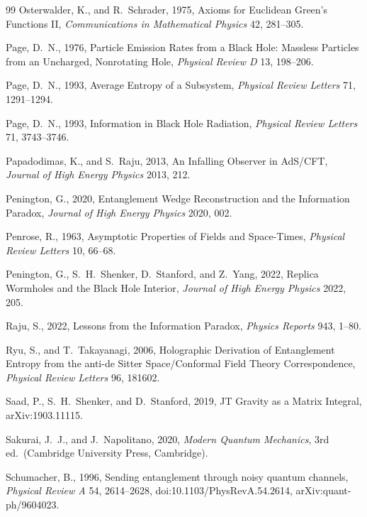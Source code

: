 \documentclass[11pt,letterpaper]{article}
\theoremstyle{plain}
\theoremstyle{definition}
\theoremstyle{remark}
\begin{document}
\begin{thebibliography}{99}
Osterwalder, K., and R.~Schrader, 1975, Axioms for Euclidean Green's Functions II, \textit{Communications in Mathematical Physics} 42, 281--305.

Page, D.~N., 1976, Particle Emission Rates from a Black Hole: Massless Particles from an Uncharged, Nonrotating Hole, \textit{Physical Review D} 13, 198--206.

Page, D.~N., 1993, Average Entropy of a Subsystem, \textit{Physical Review Letters} 71, 1291--1294.

Page, D.~N., 1993, Information in Black Hole Radiation, \textit{Physical Review Letters} 71, 3743--3746.

Papadodimas, K., and S.~Raju, 2013, An Infalling Observer in AdS/CFT, \textit{Journal of High Energy Physics} 2013, 212.

Penington, G., 2020, Entanglement Wedge Reconstruction and the Information Paradox, \textit{Journal of High Energy Physics} 2020, 002.

Penrose, R., 1963, Asymptotic Properties of Fields and Space-Times, \textit{Physical Review Letters} 10, 66--68.

Penington, G., S.~H.~Shenker, D.~Stanford, and Z.~Yang, 2022, Replica Wormholes and the Black Hole Interior, \textit{Journal of High Energy Physics} 2022, 205.

Raju, S., 2022, Lessons from the Information Paradox, \textit{Physics Reports} 943, 1--80.

Ryu, S., and T.~Takayanagi, 2006, Holographic Derivation of Entanglement Entropy from the anti-de Sitter Space/Conformal Field Theory Correspondence, \textit{Physical Review Letters} 96, 181602.

Saad, P., S.~H.~Shenker, and D.~Stanford, 2019, JT Gravity as a Matrix Integral, arXiv:1903.11115.

Sakurai, J.~J., and J.~Napolitano, 2020, \textit{Modern Quantum Mechanics}, 3rd ed.\ (Cambridge University Press, Cambridge).

Schumacher, B., 1996, Sending entanglement through noisy quantum channels,
\textit{Physical Review A} 54, 2614--2628,
doi:10.1103/PhysRevA.54.2614, arXiv:quant-ph/9604023.


\end{thebibliography}
\end{document}
